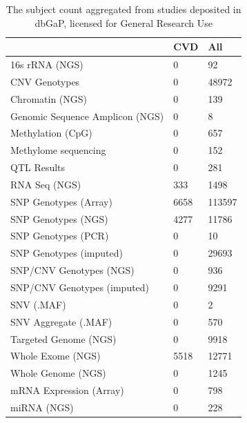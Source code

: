 \documentclass{bioinfo}
\begin{document}
\begin{table}[]
	\caption{The subject count aggregated from studies deposited in dbGaP, licensed for General Research Use}
	\label{tab:dbgapSubject}
	\begin{tabular}{l l l}
		\toprule
		& \textbf{CVD} &  \textbf{All}                         \\ \midrule
		16s rRNA (NGS)                 &     0 &      92 \\
		CNV Genotypes                  &     0 &   48972 \\
		Chromatin (NGS)                &     0 &     139 \\
		Genomic Sequence Amplicon (NGS)&     0 &       8 \\
		Methylation (CpG)              &     0 &     657 \\
		Methylome sequencing           &     0 &     152 \\
		QTL Results                    &     0 &     281 \\
		RNA Seq (NGS)                  &   333 &    1498 \\
		SNP Genotypes (Array)          &  6658 &  113597 \\
		SNP Genotypes (NGS)            &  4277 &   11786 \\
		SNP Genotypes (PCR)            &     0 &      10 \\
		SNP Genotypes (imputed)        &     0 &   29693 \\
		SNP/CNV Genotypes (NGS)        &     0 &     936 \\
		SNP/CNV Genotypes (imputed)    &     0 &    9291 \\
		SNV (.MAF)                     &     0 &       2 \\
		SNV Aggregate (.MAF)           &     0 &     570 \\
		Targeted Genome (NGS)          &     0 &    9918 \\
		Whole Exome (NGS)              &  5518 &   12771 \\
		Whole Genome (NGS)             &     0 &    1245 \\
		mRNA Expression (Array)        &     0 &     798 \\
		miRNA (NGS)                        & 0 &   228 \\ \hline
	\end{tabular}
\end{table}
\end{document}
